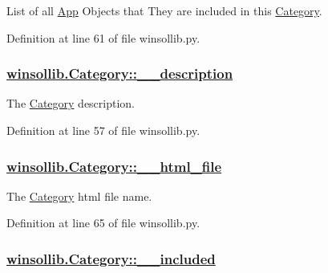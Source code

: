 List of all \hyperlink{classwinsollib_1_1App}{App} Objects that They are included in this \hyperlink{classwinsollib_1_1Category}{Category}. 



Definition at line 61 of file winsollib.py.\hypertarget{classwinsollib_1_1Category_5351cf0c97649f60867873ee04fbdb5c}{
\subsubsection[\_\-\_\-description]{\setlength{\rightskip}{0pt plus 5cm}\hyperlink{classwinsollib_1_1Category_5351cf0c97649f60867873ee04fbdb5c}{winsollib.Category::\_\-\_\-description}}}
\label{classwinsollib_1_1Category_5351cf0c97649f60867873ee04fbdb5c}


The \hyperlink{classwinsollib_1_1Category}{Category} description. 



Definition at line 57 of file winsollib.py.\hypertarget{classwinsollib_1_1Category_47f46cbec7d249f1dc80655eaf732895}{
\subsubsection[\_\-\_\-html\_\-file]{\setlength{\rightskip}{0pt plus 5cm}\hyperlink{classwinsollib_1_1Category_47f46cbec7d249f1dc80655eaf732895}{winsollib.Category::\_\-\_\-html\_\-file}}}
\label{classwinsollib_1_1Category_47f46cbec7d249f1dc80655eaf732895}


The \hyperlink{classwinsollib_1_1Category}{Category} html file name. 



Definition at line 65 of file winsollib.py.\hypertarget{classwinsollib_1_1Category_bdc064b23cc9cb3946b54d381f4401e3}{
\subsubsection[\_\-\_\-included]{\setlength{\rightskip}{0pt plus 5cm}\hyperlink{classwinsollib_1_1Category_bdc064b23cc9cb3946b54d381f4401e3}{winsollib.Category::\_\-\_\-included}}}
\label{classwinsollib_1_1Category_bdc064b23cc9cb3946b54d381f4401e3}


